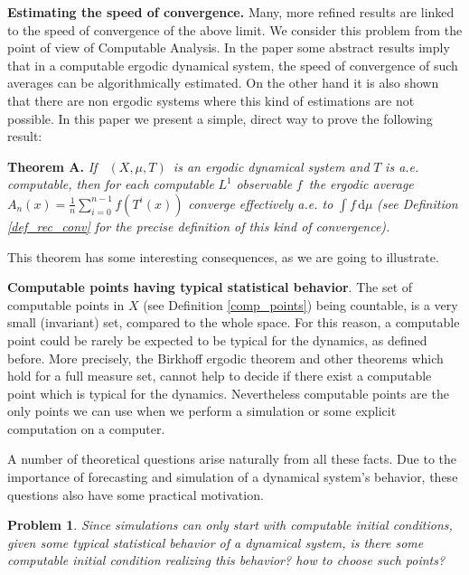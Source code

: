 \documentclass[copyright,creativecommons]{eptcs}
\newtheorem{problem}{Problem}
\numberwithin{equation}{section}
\begin{document}
\noindent \textbf{Estimating the speed of convergence. }Many, more refined
results are linked to the speed of convergence of the above limit. We
consider this problem from the point of view of Computable Analysis. In the
paper \cite{AvigadGT10} some abstract results imply that in a computable
ergodic dynamical system, the speed of convergence of such averages can be
algorithmically estimated. On the other hand it is also shown that there are
non ergodic systems where this kind of estimations are not possible. In this
paper we present a simple, direct way to prove the following result:

\smallskip

\noindent \textbf{Theorem A. } \emph{If \ }$(X,\mu ,T)$\emph{\ is an ergodic
dynamical system and }$T$ \emph{is a.e. computable, then for each computable }$L^{1}$ \emph{observable }$f$\emph{\ the ergodic average }$A_{n}(x)=\frac{1}{n}\sum_{i=0}^{n-1}f(T^{i}(x))$ \emph{converge effectively a.e. to }$\int \!{f}\,\mathrm{d}{\mu }$ \emph{(see Definition \ref{def_rec_conv} for the precise
definition of this kind of convergence).} \newline

This theorem has some interesting consequences, as we are going to
illustrate.

\smallskip

\noindent \textbf{Computable points having typical statistical behavior}.
The set of computable points in $X$ (see Definition \ref{comp_points}) being
countable, is a very small (invariant) set, compared to the whole space. For
this reason, a computable point could be rarely be expected to be typical
for the dynamics, as defined before. More precisely, the Birkhoff ergodic
theorem and other theorems which hold for a full measure set, cannot help to
decide if there exist a computable point which is typical for the dynamics.
Nevertheless computable points are the only points we can use when we
perform a simulation or some explicit computation on a computer.

A number of theoretical questions arise naturally from all these facts. Due
to the importance of forecasting and simulation of a dynamical system's
behavior, these questions also have some practical motivation.

\begin{problem}
Since simulations can only start with computable initial conditions, given
some typical statistical behavior of a dynamical system, is there some
computable initial condition realizing this behavior? how to choose such
points?
\end{problem}
\end{document}
